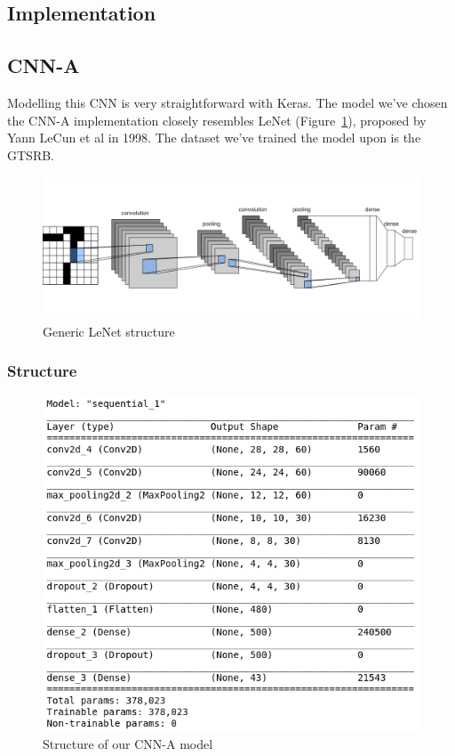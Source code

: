 \documentclass[12pt, landscape]{article}
\begin{document}
\begin{multicols}{3}
\section{Implementation}

\subsection{CNN-A}
Modelling this CNN is very straightforward with Keras. The model we've chosen the
CNN-A implementation closely resembles LeNet (Figure~\ref{fig:figurelenet}),
proposed by Yann LeCun et al in 1998. The dataset we've trained the model upon
is the GTSRB.
\begin{figure}[H]
    \centerline{\includegraphics[scale = 0.2]{lenet.png}}
    \caption{Generic LeNet structure}
    \label{fig:figurelenet}
\end{figure}

\subsubsection{Structure}
\begin{figure}[H]
    \centerline{\includegraphics[scale = 0.5]{model.png}}
    \caption{Structure of our CNN-A model}
    \label{fig:figuremodel}
\end{figure}


\end{multicols}
\end{document}
